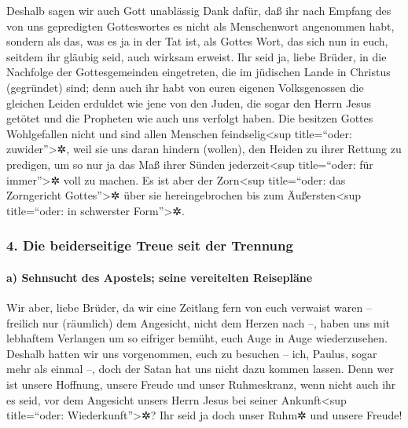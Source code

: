  Deshalb sagen wir auch Gott unablässig Dank dafür, daß
ihr nach Empfang des von uns gepredigten Gotteswortes es nicht als
Menschenwort angenommen habt, sondern als das, was es ja in der Tat ist,
als Gottes Wort, das sich nun in euch, seitdem ihr gläubig seid, auch
wirksam erweist.  Ihr seid ja, liebe Brüder, in die
Nachfolge der Gottesgemeinden eingetreten, die im jüdischen Lande in
Christus (gegründet) sind; denn auch ihr habt von euren eigenen
Volksgenossen die gleichen Leiden erduldet wie jene von den Juden,
 die sogar den Herrn Jesus getötet und die Propheten wie
auch uns verfolgt haben. Die besitzen Gottes Wohlgefallen nicht und sind
allen Menschen feindselig\textless sup title=``oder:
zuwider''\textgreater✲,  weil sie uns daran hindern
(wollen), den Heiden zu ihrer Rettung zu predigen, um so nur ja das Maß
ihrer Sünden jederzeit\textless sup title=``oder: für
immer''\textgreater✲ voll zu machen. Es ist aber der Zorn\textless sup
title=``oder: das Zorngericht Gottes''\textgreater✲ über sie
hereingebrochen bis zum Äußersten\textless sup title=``oder: in
schwerster Form''\textgreater✲.

\hypertarget{die-beiderseitige-treue-seit-der-trennung}{%
\subsubsection{4. Die beiderseitige Treue seit der
Trennung}\label{die-beiderseitige-treue-seit-der-trennung}}

\hypertarget{a-sehnsucht-des-apostels-seine-vereitelten-reisepluxe4ne}{%
\paragraph{a) Sehnsucht des Apostels; seine vereitelten
Reisepläne}\label{a-sehnsucht-des-apostels-seine-vereitelten-reisepluxe4ne}}

 Wir aber, liebe Brüder, da wir eine Zeitlang fern von
euch verwaist waren -- freilich nur (räumlich) dem Angesicht, nicht dem
Herzen nach --, haben uns mit lebhaftem Verlangen um so eifriger bemüht,
euch Auge in Auge wiederzusehen.  Deshalb hatten wir uns
vorgenommen, euch zu besuchen -- ich, Paulus, sogar mehr als einmal --,
doch der Satan hat uns nicht dazu kommen lassen.  Denn
wer ist unsere Hoffnung, unsere Freude und unser Ruhmeskranz, wenn nicht
auch ihr es seid, vor dem Angesicht unsers Herrn Jesus bei seiner
Ankunft\textless sup title=``oder: Wiederkunft''\textgreater✲?
 Ihr seid ja doch unser Ruhm✲ und unsere Freude!

